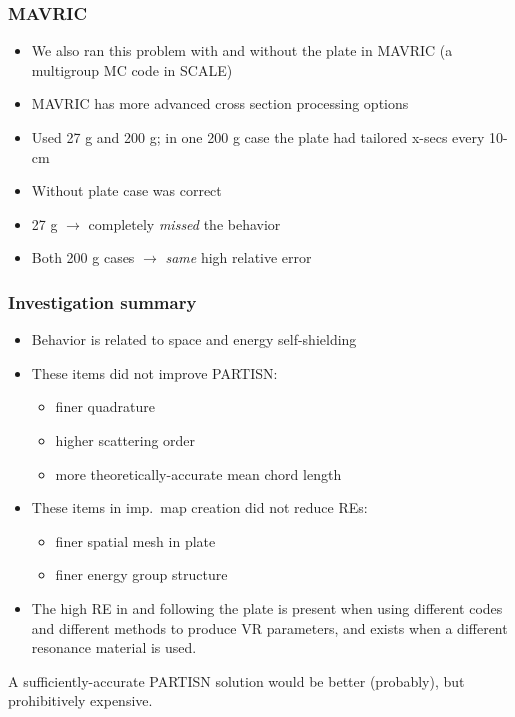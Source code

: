 \documentclass[xcolor=x11names,compress]{beamer}
\renewcommand{\(}{\begin{columns}}
\renewcommand{\)}{\end{columns}}
\newcommand{\<}[1]{\begin{column}{#1}}
\renewcommand{\>}{\end{column}}
\begin{document}
\begin{frame}[fragile]
  \frametitle{MAVRIC}
  
  \begin{itemize}
  \item We also ran this problem with and without the plate in MAVRIC (a multigroup MC code in SCALE)
  \item MAVRIC has more advanced cross section processing options
  \item Used 27 g and 200 g; in one 200 g case the plate had tailored x-secs every 10-cm \vspace*{0.5em}
  \pause
  \item Without plate case was correct
  \item 27 g $\rightarrow$ completely \textit{missed} the behavior
  \item Both 200 g cases $\rightarrow$ \textit{same} high relative error
  \end{itemize}
  
\end{frame}


\begin{frame}[fragile]
  \frametitle{Investigation summary}
  
	\begin{itemize}
	\item Behavior is related to space and energy self-shielding
	\pause
	\item These items did not improve PARTISN:
	 \begin{itemize}
	 \item finer quadrature
	 \item higher scattering order
	 \item more theoretically-accurate mean chord length
	 \end{itemize}
	\pause 
	\item These items in imp.\ map creation did not reduce REs:
	 \begin{itemize}
	 \item finer spatial mesh in plate
	 \item finer energy group structure
	 \end{itemize}
	\pause 
	\item The high RE in and following the plate is present when using different codes and different methods to produce VR parameters, and exists when a different resonance material is used.
	\end{itemize}


A sufficiently-accurate PARTISN solution would be better (probably), but prohibitively expensive.
  
\end{frame}
\end{document}
